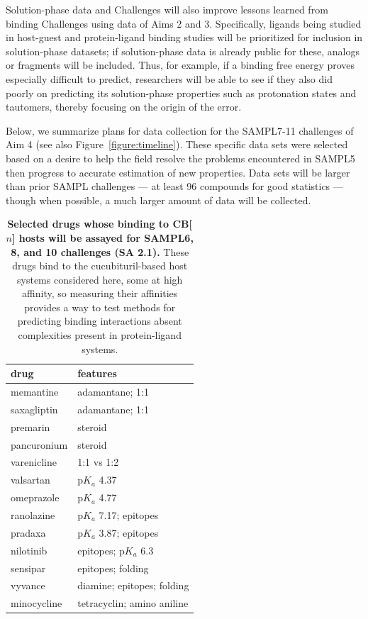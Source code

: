 \documentclass[11pt]{article}
\begin{document}
Solution-phase data and Challenges will also improve lessons learned from binding Challenges using data of Aims 2 and 3.
Specifically, ligands being studied in host-guest and protein-ligand binding studies will be prioritized for inclusion in solution-phase datasets; if solution-phase data is already public for these, analogs or fragments will be included. 
Thus, for example, if a binding free energy proves especially difficult to predict, researchers will be able to see if they also did poorly on predicting its solution-phase properties such as protonation states and tautomers, thereby focusing on the origin of the error.

Below, we summarize plans for data collection for the SAMPL7-11 challenges of Aim 4 (see also Figure~\ref{figure:timeline}).
These specific data sets were selected based on a desire to help the field resolve the problems encountered in SAMPL5 then progress to accurate estimation of new properties.
Data sets will be larger than prior SAMPL challenges --- at least 96 compounds for good statistics ---  though when possible, a much larger amount of data will be collected.

\begin{table}
\vspace{-0.2in}
\footnotesize
\begin{tabular}{l | l}
{\bf drug} & {\bf features} \\
\hline
memantine & adamantane; 1:1 \\
saxagliptin & adamantane; 1:1 \\
premarin & steroid \\
pancuronium & steroid\\
varenicline & 1:1 vs 1:2 \\
valsartan & p$K_a$ 4.37 \\ 
omeprazole & p$K_a$ 4.77 \\
ranolazine & p$K_a$ 7.17; epitopes \\
pradaxa & p$K_a$ 3.87; epitopes \\
nilotinib & epitopes; p$K_a$ 6.3 \\
sensipar & epitopes; folding \\
vyvance & diamine; epitopes; folding \\
minocycline & tetracyclin; amino aniline \\
\end{tabular}
\caption{\textbf{\label{table:CB} Selected drugs whose binding to CB[$n$] hosts will be assayed for SAMPL6, 8, and 10 challenges (SA 2.1).}  %
These drugs bind to the cucubituril-based host systems considered here, some at high affinity, so measuring their affinities provides a way to test methods for predicting binding interactions absent complexities present in protein-ligand systems.
}
\vspace{-0.1in}
\end{table}
\end{document}
